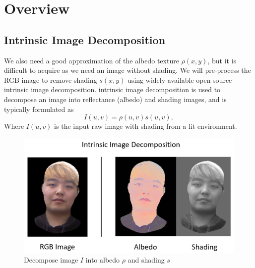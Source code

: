 \documentclass[10pt,twocolumn,letterpaper]{article}
\begin{document}
\section{Overview}
\subsection{Intrinsic Image Decomposition}
 We also need a good approximation of the albedo texture $\rho(x,y)$, but it is difficult to acquire as we need an image without shading. We will pre-process the RGB image to remove shading $s(x,y)$ using widely available open-source intrinsic image decomposition\cite{bell}. intrinsic image decomposition is used to decompose an image into reflectance (albedo) and shading images, and is typically formulated as 
\begin{equation}
I(u,v) = \rho(u,v)s(u,v),
\end{equation}
Where $I(u,v)$ is the input raw image with shading from a lit environment. 
\begin{figure}[!h]
    \begin{center}
        \includegraphics [scale=0.3] {image/intrinsic.png}
    \end{center}
    \caption{Decompose image $I$ into albedo $\rho$ and shading $s$}
    \label{fig:pipe1}
\end{figure} 
\end{document}
